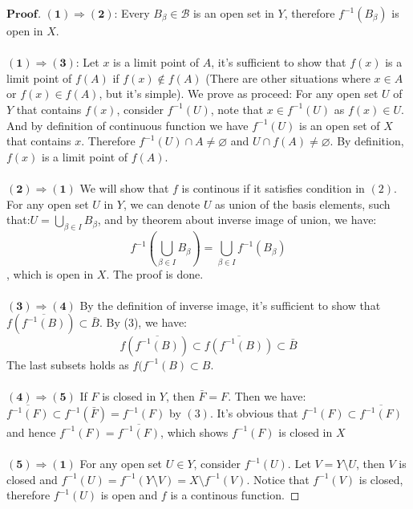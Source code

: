 \documentclass[a4paper, 11pt]{article}
\theoremstyle{definition}
\theoremstyle{remark}
\newenvironment{myprf}
{\renewcommand\qedsymbol{$ $}\begin{proof}[$\mathbf{Proof}$]}
  {\end{proof}}
\theoremstyle{definition}
\begin{document}
\begin{myprf}
        $\mathbf{(1)\Rightarrow (2)}$: Every $B_{\beta}\in \mathcal{B}$ is 
        an open set in $Y$,  therefore $f^{-1}(B_{\beta})$ is open in $X$.\\
        \\
        $\mathbf{(1)\Rightarrow (3)}$: Let $x$ is a limit point of $A$, it's sufficient
        to show that $f(x)$ is a limit point of $f(A)$ if $f(x)\notin f(A)$
        (There
        are other situations where $x\in A$ or $f(x)\in f(A)$, but it's
        simple). We prove as proceed:
        For any open set $U$ of $Y$ that contains $f(x)$, consider $f^{-1}(U)$,
        note that $x\in f^{-1}(U)$ as $f(x)\in U$. And by definition of continuous
        function we have $f^{-1}(U)$ is an open set of $X$ that contains $x$. 
        Therefore $f^{-1}(U)\cap A \neq \varnothing$ and $U\cap f(A)\neq 
        \varnothing$. By definition, $f(x)$ is a limit point of $f(A)$.\\
        \\
        $\mathbf{(2)\Rightarrow (1)}$ We will show that $f$ is continous if it
        satisfies condition in $(2)$. For any open set $U$ in $Y$, we can denote
        $U$ as union of the basis elements, such that:$\displaystyle 
        U=\bigcup_{\beta\in I}B_{\beta}$, and by theorem about inverse image 
        of union, we have:
        $$
        f^{-1}(\bigcup_{\beta\in I}B_{\beta})=\bigcup_{\beta\in I} f^{-1}(B_{\beta})
        $$, which is open in $X$. The proof is done.\\
        \\
        $\mathbf{(3)\Rightarrow (4)}$ By the definition of inverse image, it's 
        sufficient to show that $f(\overline{f^{-1}(B)})\subset \bar{B}$.
        By (3), we have:
        $$
        f(\overline{f^{-1}(B)})\subset \overline{f(f^{-1}(B))}\subset \bar{B}
        $$
        The last subsets holds as $f(f^{-1}(B)\subset B$.\\
        \\
        $\mathbf{(4)\Rightarrow (5)}$ If $F$ is closed in $Y$, then 
        $\bar{F}=F$. Then we have: $\overline{f^{-1}(F)}\subset f^{-1}(\bar{F})
        =f^{-1}(F)$ by $(3)$. It's obvious that $f^{-1}(F)\subset \overline{f^{-1}(F)}$ and hence $f^{-1}(F)=\overline{f^{-1}(F)}$, which shows
                $f^{-1}(F)$ is closed in $X$\\
        \\
        $\mathbf{(5)\Rightarrow (1)}$ For any open set $U\in Y$, consider
        $f^{-1}(U)$. Let $V=Y\setminus U$, then $V$ is closed and
        $f^{-1}(U)=f^{-1}(Y\setminus V)=X\setminus f^{-1}(V)$. Notice that
        $f^{-1}(V)$ is closed, therefore $f^{-1}(U)$ is open and $f$ is 
        a continous function.
\end{myprf}
\end{document}

